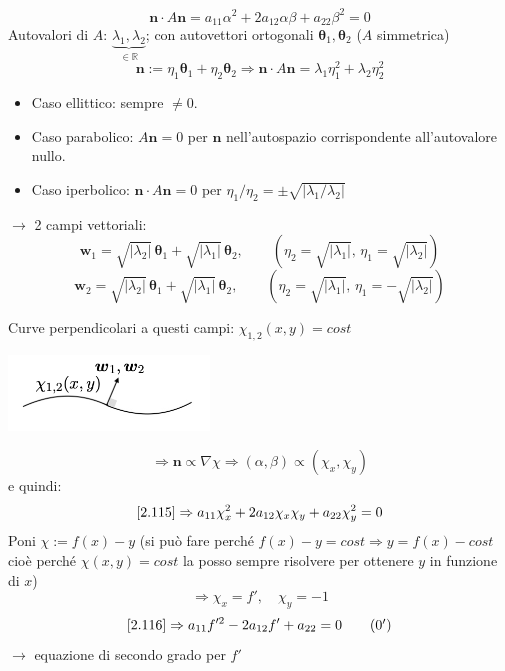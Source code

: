 \documentclass[a4paper,11pt]{report}
\newcommand{\vect}[1]{\boldsymbol{#1}}
\newcommand{\R}{\mathbb{R}}
\begin{document}
\begin{equation}
\vect{n}\cdot A\vect{n}=a_{11}\alpha^2+2a_{12}\alpha\beta + a_{22}\beta^2=0
\label{2.115}
\end{equation}
Autovalori di $A$: $\underbrace{\lambda_1,\lambda_2}_{\in\R}$; con autovettori ortogonali $\vect{\theta}_1,\vect{\theta}_2$ ($A$ simmetrica)
\[
\vect{n}:= \eta_1 \vect{\theta}_1 + \eta_2\vect{\theta}_2 \Rightarrow \vect{n}\cdot A \vect{n}=\lambda_1\eta_1^2 + \lambda_2\eta_2^2
\]
\begin{itemize}
\item Caso ellittico: sempre $\neq 0$.
\item Caso parabolico: $A\vect{n}=0$ per $\vect{n}$ nell'autospazio corrispondente all'autovalore nullo.
\item Caso iperbolico: $\vect{n}\cdot A\vect{n} = 0$ per ${\eta_1}/{\eta_2}=\pm \sqrt{\left|{\lambda_1}/{\lambda_2}\right|}$
\end{itemize}
$\rightarrow$ 2 campi vettoriali:
\[
\vect{w}_1 = \sqrt{|\lambda_2|}\,\vect{\theta}_1 + \sqrt{|\lambda_1|}\,\vect{\theta}_2, \qquad (\eta_2=\sqrt{|\lambda_1|},\, \eta_1=\sqrt{|\lambda_2|})
\]
\[
\vect{w}_2 = \sqrt{|\lambda_2|}\,\vect{\theta}_1 + \sqrt{|\lambda_1|}\,\vect{\theta}_2, \qquad (\eta_2=\sqrt{|\lambda_1|},\, \eta_1=-\sqrt{|\lambda_2|})
\]

Curve perpendicolari a questi campi: $\chi_{1,2}(x,y)=cost$
\begin{center}
\includegraphics[width=0.4\textwidth]{immagini/curva3}
\end{center}

\[
\Rightarrow \vect{n} \propto \nabla\chi \Rightarrow (\alpha,\beta) \propto (\chi_x, \chi_y)
\]
e quindi:
\begin{equation}
\eqref{2.115} \Rightarrow a_{11}\chi_x^2 + 2a_{12}\chi_x\chi_y + a_{22}\chi_y^2 =0
\label{2.116}
\end{equation}
Poni $\chi := f(x)-y$ (si pu\`o fare perch\'e $f(x)-y=cost \Rightarrow y=f(x) - cost$ cio\`e perch\'e $\chi(x,y)=cost$ la posso sempre risolvere per ottenere $y$ in funzione di $x$)
\[
\Rightarrow \chi_x = f', \quad \chi_y=-1
\]
\begin{equation}
\eqref{2.116}\Rightarrow a_{11}f'^2 - 2 a_{12}f' + a_{22}=0
\label{2.116'}
\tag{$\theequation^\prime$}
\end{equation}
$\rightarrow$ equazione di secondo grado per $f'$
\end{document}

